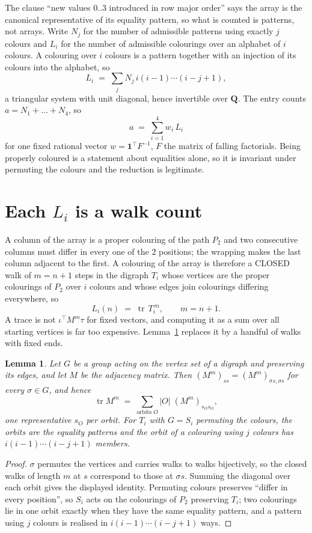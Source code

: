\documentclass[11pt,a4paper]{article}
\theoremstyle{plain}
\newtheorem{lemma}[theorem]{Lemma}
\theoremstyle{definition}
\begin{document}
The clause ``new values $0..3$ introduced in row major order'' says the array is the
canonical representative of its equality pattern, so what is counted is patterns, not arrays.
Write $N_j$ for the number of admissible patterns using exactly $j$ colours and $L_i$ for the
number of admissible colourings over an alphabet of $i$ colours. A colouring over $i$ colours
is a pattern together with an injection of its colours into the alphabet, so
\[
L_i\;=\;\sum_j N_j\,i(i-1)\cdots(i-j+1),
\]
a triangular system with unit diagonal, hence invertible over $\mathbf{Q}$. The entry counts
$a=N_1+\dots+N_{4}$, so
\[
a\;=\;\sum_{i=1}^{4}w_i\,L_i
\]
for one fixed rational vector $w=\mathbf{1}^{\!\top}F^{-1}$, $F$ the matrix of falling
factorials. Being properly coloured is a statement about equalities alone, so it is invariant
under permuting the colours and the reduction is legitimate.

\section{Each $L_i$ is a walk count}

A column of the array is a proper colouring of the path $P_{2}$ and two consecutive
columns must differ in every one of the $2$ positions; the wrapping makes the last column
adjacent to the first. A colouring of the array is therefore a CLOSED walk of $m=n+1$ steps
in the digraph $T_i$ whose vertices are the proper colourings of $P_{2}$ over $i$ colours
and whose edges join colourings differing everywhere, so
\[
L_i(n)\;=\;\operatorname{tr}\,T_i^{\,m},\qquad m=n+1.
\]
A trace is not $\iota^{\!\top}M^m\tau$ for fixed vectors, and computing it as a sum over all
starting vertices is far too expensive. Lemma~\ref{lem:trace} replaces it by a handful of
walks with fixed ends.

\begin{lemma}\label{lem:trace}
Let $G$ be a group acting on the vertex set of a digraph and preserving its edges, and let $M$
be the adjacency matrix. Then $(M^m)_{ss}=(M^m)_{\sigma s,\sigma s}$ for every
$\sigma\in G$, and hence
\[
\operatorname{tr} M^m\;=\;\sum_{\text{orbits }O}|O|\;(M^m)_{s_O s_O} ,
\]
one representative $s_O$ per orbit. For $T_i$ with $G=S_i$ permuting the colours, the orbits
are the equality patterns and the orbit of a colouring using $j$ colours has
$i(i-1)\cdots(i-j+1)$ members.
\end{lemma}

\begin{proof}
$\sigma$ permutes the vertices and carries walks to walks bijectively, so the closed walks of
length $m$ at $s$ correspond to those at $\sigma s$. Summing the diagonal over each orbit
gives the displayed identity. Permuting colours preserves ``differ in every position'', so
$S_i$ acts on the colourings of $P_{2}$ preserving $T_i$; two colourings lie in one orbit
exactly when they have the same equality pattern, and a pattern using $j$ colours is realised
in $i(i-1)\cdots(i-j+1)$ ways.
\end{proof}
\end{document}
